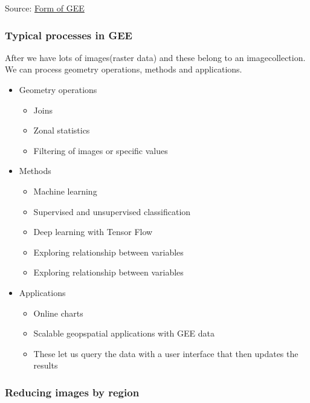 \documentclass[
  letterpaper,
  DIV=11,
  numbers=noendperiod]{scrreprt}
\begin{document}
Source:
\href{https://andrewmaclachlan.github.io/CASA0023-lecture-5/\#31}{Form
of GEE}

\hypertarget{typical-processes-in-gee}{%
\subsubsection{Typical processes in
GEE}\label{typical-processes-in-gee}}

After we have lots of images(raster data) and these belong to an
imagecollection. We can process geometry operations, methods and
applications.

\begin{itemize}
\item
  Geometry operations

  \begin{itemize}
  \item
    Joins
  \item
    Zonal statistics
  \item
    Filtering of images or specific values
  \end{itemize}
\item
  Methods

  \begin{itemize}
  \item
    Machine learning
  \item
    Supervised and unsupervised classification
  \item
    Deep learning with Tensor Flow
  \item
    Exploring relationship between variables
  \item
    Exploring relationship between variables
  \end{itemize}
\item
  Applications

  \begin{itemize}
  \item
    Online charts
  \item
    Scalable geopspatial applications with GEE data
  \item
    These let us query the data with a user interface that then updates
    the results
  \end{itemize}
\end{itemize}

\hypertarget{reducing-images-by-region}{%
\subsubsection{Reducing images by
region}\label{reducing-images-by-region}}
\end{document}
